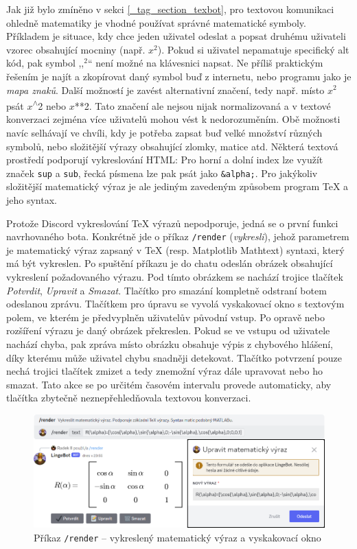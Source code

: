 \documentclass[FM]{tulthesis}
\begin{document}
	Jak již bylo zmíněno v sekci \ref{_tag_section_texbot}, pro textovou komunikaci ohledně matematiky je vhodné používat správné matematické symboly. Příkladem je situace, kdy chce jeden uživatel odeslat a popsat druhému uživateli vzorec obsahující mocniny (např. $x^2$). Pokud si uživatel nepamatuje specifický alt kód, pak symbol ,,$^2$`` není možné na klávesnici napsat. Ne příliš praktickým řešením je najít a zkopírovat daný symbol buď z internetu, nebo programu jako je \textit{mapa znaků}. Další možností je zavést alternativní značení, tedy např. místo $x^2$ psát $x$\textsuperscript{$\wedge$}2 nebo $x$**2. Tato značení ale nejsou nijak normalizovaná a v textové konverzaci zejména více uživatelů mohou vést k nedorozuměním. Obě možnosti navíc selhávají ve chvíli, kdy je potřeba zapsat buď velké množství různých symbolů, nebo složitější výrazy obsahující zlomky, matice atd. Některá textová prostředí podporují vykreslování HTML: Pro horní a dolní index lze využít značek \verb|sup| a \verb|sub|, řecká písmena lze pak psát jako \verb|&alpha;|. Pro jakýkoliv složitější matematický výraz je ale jediným zavedeným způsobem program TeX a jeho syntax.
	
	Protože Discord vykreslování TeX výrazů nepodporuje, jedná se o první funkci navrhovaného bota. Konkrétně jde o příkaz \verb|/render| (\textit{vykresli}), jehož parametrem je matematický výraz zapsaný v TeX (resp. Matplotlib Mathtext) syntaxi, který má být vykreslen. Po spuštění příkazu je do chatu odeslán obrázek obsahující \mbox{vykreslení} požadovaného výrazu. Pod tímto obrázkem se nachází trojice tlačítek \mbox{\textit{Potvrdit}}, \textit{Upravit} a \textit{Smazat}. Tlačítko pro smazání kompletně odstraní botem odeslanou zprávu. Tlačítkem pro úpravu se vyvolá vyskakovací okno s textovým polem, ve kterém je předvyplněn uživatelův původní vstup. Po opravě nebo rozšíření výrazu je daný obrázek překreslen. Pokud se ve vstupu od uživatele nachází chyba, pak zpráva místo obrázku obsahuje výpis z chybového hlášení, díky kterému může uživatel chybu snadněji detekovat. Tlačítko potvrzení pouze nechá trojici tlačítek zmizet a tedy znemožní výraz dále upravovat nebo ho smazat. Tato akce se po určitém časovém intervalu provede automaticky, aby tlačítka zbytečně neznepřehledňovala textovou konverzaci.
	
	\begin{figure}[ht]
		\centering
		\includegraphics[width=\textwidth]{img/5X/Render}
		\caption{Příkaz \texttt{/render} – vykreslený matematický výraz a vyskakovací okno}
	\end{figure}
	
\end{document}
